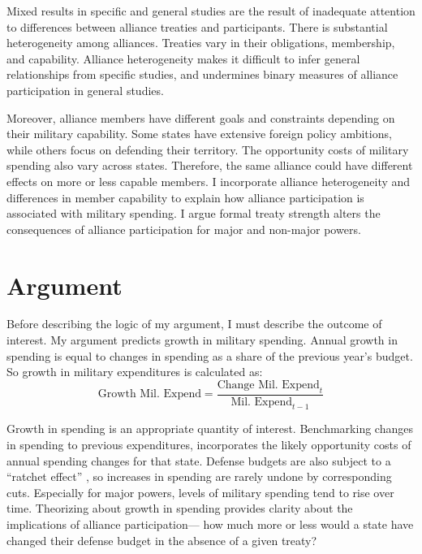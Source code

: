 \documentclass[12pt]{article}
\begin{document}
Mixed results in specific and general studies are the result of inadequate attention to differences between alliance treaties and participants.
There is substantial heterogeneity among alliances.
Treaties vary in their obligations, membership, and capability. 
Alliance heterogeneity makes it difficult to infer general relationships from specific studies, and undermines binary measures of alliance participation in general studies. 
 

Moreover, alliance members have different goals and constraints depending on their military capability.
Some states have extensive foreign policy ambitions, while others focus on defending their territory. 
The opportunity costs of military spending also vary across states. 
Therefore, the same alliance could have different effects on more or less capable members. 
I incorporate alliance heterogeneity and differences in member capability to explain how alliance participation is associated with military spending. 
I argue formal treaty strength alters the consequences of alliance participation for major and non-major powers. 



\section{Argument}

Before describing the logic of my argument, I must describe the outcome of interest. 
My argument predicts growth in military spending. 
Annual growth in spending is equal to changes in spending as a share of the previous year's budget. 
So growth in military expenditures is calculated as:
\begin{equation}
\mbox{Growth Mil. Expend} = \frac{ \mbox{Change Mil. Expend}_t }{ \mbox{Mil. Expend}_{t-1} }
\end{equation} 


Growth in spending is an appropriate quantity of interest. 
Benchmarking changes in spending to previous expenditures, incorporates the likely opportunity costs of annual spending changes for that state. 
Defense budgets are also subject to a ``ratchet effect'' \cite{Zielinskietal2017}, so increases in spending are rarely undone by corresponding cuts.
Especially for major powers, levels of military spending tend to rise over time. 
Theorizing about growth in spending provides clarity about the implications of alliance participation--- how much more or less would a state have changed their defense budget in the absence of a given treaty? 
\end{document}
